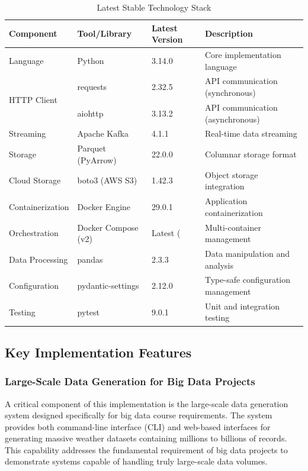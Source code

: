 \documentclass[12pt,a4paper]{article}
\begin{document}
\begin{table}[h]
\centering
\begin{tabular}{|l|l|l|l|}
\hline
\textbf{Component} & \textbf{Tool/Library} & \textbf{Latest Version} & \textbf{Description} \\
\hline
\multirow{1}{*}{Language} & Python & 3.14.0 & Core implementation language \\
\hline
\multirow{2}{*}{HTTP Client} & requests & 2.32.5 & API communication (synchronous) \\
\cline{2-4}
 & aiohttp & 3.13.2 & API communication (asynchronous) \\
\hline
Streaming & Apache Kafka & 4.1.1 & Real-time data streaming \\
\hline
Storage & Parquet (PyArrow) & 22.0.0 & Columnar storage format \\
\hline
Cloud Storage & boto3 (AWS S3) & 1.42.3 & Object storage integration \\
\hline
Containerization & Docker Engine & 29.0.1 & Application containerization \\
\hline
Orchestration & Docker Compose (v2) & Latest (& Multi-container management \\
\hline
Data Processing & pandas & 2.3.3 & Data manipulation and analysis \\
\hline
Configuration & pydantic-settings & 2.12.0 & Type-safe configuration management \\
\hline
Testing & pytest & 9.0.1 & Unit and integration testing \\
\hline
\end{tabular}
\caption{Latest Stable Technology Stack}
\label{tab:latest_tech_stack}
\end{table}

\subsection{Key Implementation Features}

\subsubsection{Large-Scale Data Generation for Big Data Projects}

A critical component of this implementation is the large-scale data generation system designed specifically for big data course requirements. The system provides both command-line interface (CLI) and web-based interfaces for generating massive weather datasets containing millions to billions of records. This capability addresses the fundamental requirement of big data projects to demonstrate systems capable of handling truly large-scale data volumes.
\end{document}
